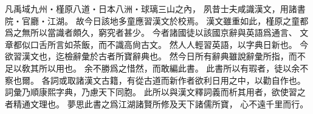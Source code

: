 凡禹域九州・槿原八道・日本八洲・球璃三山之內，
夙昔士夫咸識漢文，用諸書院・官廳・江湖。
故今日該地多童應習漢文於校焉。
漢文雖重如此，槿原之童都爲之無所以當識者頗久，窮究者甚少。
今者諸國徒以該國京辭與英語爲通言、
文章都似口舌所言如茶飯，而不識高尙古文。
然人人輕習英語，以字典日新也。
今欲習漢文也，迄檢辭彙於古者所寶辭典也。
然今日所有辭典雖說辭彙所指，而不足以敎其所以用也。
余不勝爲之惜然，而敢編此書。
此書所以有瑕者，徒以余不察也爾。
各詞或取諸漢文古籍，有從古道而新作者欲利日用之中，以勸自作也。
詞彙乃順康熙字典，乃慮天下同胞。
此所以與漢文釋詞義而析其用者，欲使習之者精通文理也。
夢思此書之爲江湖諸賢所修及天下諸儒所寶，
心不遠千里而行。
